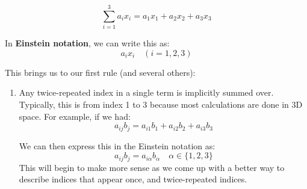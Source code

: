 \begin{equation}
    \sum^3_{i=1} a_i x_i = a_1 x_1 + a_2 x_2 + a_3 x_3
\end{equation}

In \textbf{Einstein notation}, we can write this as:
\begin{equation}
    a_i x_i \quad (i = 1,2,3)
\end{equation}

This brings us to our first rule (and several others):
\begin{enumerate}[label=\textbf{Rule \arabic*}:, leftmargin=*, labelsep=1em]
    \item Any twice-repeated index in a single term is implicitly summed over. Typically, this is from index 1 to 3 because most calculations are done in 3D space. For example, if we had:
          \begin{equation}
              a_{ij} b_{j} = a_{i1}b_1 + a_{i2}b_2 + a_{i3}b_3
          \end{equation}

          We can then express this in the Einstein notation as:
          \begin{equation}
              a_{ij} b_{j} = a_{i\alpha} b_\alpha \quad \alpha \in \{1,2,3\}
          \end{equation}
          This will begin to make more sense as we come up with a better way to describe indices that appear once, and twice-repeated indices.


\end{enumerate}
